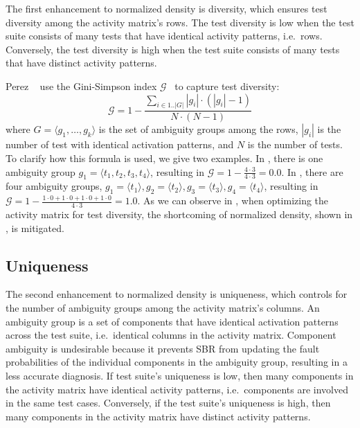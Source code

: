 \documentclass[twoside,a4paper,11pt]{memoir}
\begin{document}
The first enhancement to normalized density is diversity, which ensures test diversity among the activity matrix's rows.
The test diversity is low when the test suite consists of many tests that have identical activity patterns, i.e.\ rows.
Conversely, the test diversity is high when the test suite consists of many tests that have distinct activity patterns.

Perez \etal~\cite{DBLP:conf/icse/PerezAD17} use the Gini-Simpson index \(\mathcal{G} \)~\cite{OIK:OIK14714} to capture test diversity:
\begin{equation}
  \mathcal{G} = 1 - \frac{\sum_{i \in 1..|G|} |g_i| \cdot (|g_i| - 1)}{N \cdot (N - 1)}
\end{equation}
where \(G = \langle g_1, \dots, g_k \rangle \) is the set of ambiguity groups among the rows, \(|g_i |\) is the number of test with identical activation patterns, and \(N \) is the number of tests.
To clarify how this formula is used, we give two examples.
In , there is one ambiguity group \(g_1 = \langle t_1, t_2, t_3, t_4 \rangle \), resulting in \(\mathcal{G} = 1 - \frac{4 \cdot 3}{4 \cdot 3} = 0.0\).
In , there are four ambiguity groups, \(g_1 = \langle t_1 \rangle, g_2 = \langle t_2 \rangle, g_3 = \langle t_3 \rangle, g_4 = \langle t_4 \rangle \), resulting in \(\mathcal{G} = 1 - \frac{1 \cdot 0 + 1 \cdot 0 + 1 \cdot 0 + 1 \cdot 0}{4 \cdot 3} = 1.0\).
As we can observe in , when optimizing the activity matrix for test diversity, the shortcoming of normalized density, shown in , is mitigated.

\subsection{Uniqueness}
The second enhancement to normalized density is uniqueness, which controls for the number of ambiguity groups among the activity matrix's columns.
An ambiguity group is a set of components that have identical activation patterns across the test suite, i.e.\ identical columns in the activity matrix.
Component ambiguity is undesirable because it prevents SBR from updating the fault probabilities of the individual components in the ambiguity group, resulting in a less accurate diagnosis.
If test suite's uniqueness is low, then many components in the activity matrix have identical activity patterns, i.e.\ components are involved in the same test cases.
Conversely, if the test suite's uniqueness is high, then many components in the activity matrix have distinct activity patterns.
\end{document}
